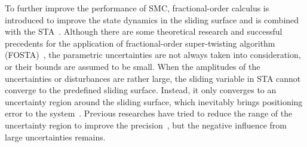 \documentclass{ifacconf}
\newcommand{\LS}[1]{\textcolor{blue}{\textbf{#1}}}
\begin{document}
To further improve the performance of SMC, fractional-order calculus is introduced to improve the state dynamics in the sliding surface and is combined with the STA~\citep{kuang2018high,wang2019adaptive}. Although there are some theoretical research and successful precedents for the application of fractional-order super-twisting algorithm (FOSTA)~\citep{wang2019adaptive,caponetto2015identification}, the parametric uncertainties are not always taken into consideration, or their bounds are assumed to be small. When the amplitudes of the uncertainties or disturbances are rather large, the sliding variable in STA cannot converge to the predefined sliding surface. Instead, it only converges to an uncertainty region around the sliding surface, which inevitably brings positioning error to the system~\citep{kuang2018simplified}. Previous researches have tried to reduce the range of the uncertainty region to improve the precision~\citep{sun2018practical}, but the negative influence from large uncertainties remains. 
 
 

\end{document}
